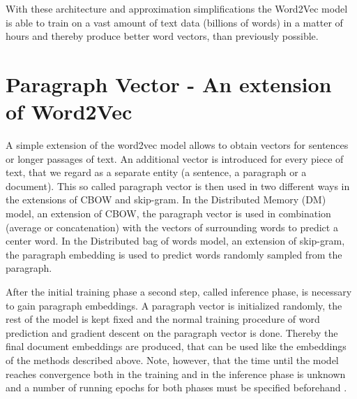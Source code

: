 \documentclass[Thesis.tex]{subfiles}
\begin{document}
With these architecture and approximation simplifications the Word2Vec
model is able to train on a vast amount of text data (billions of
words) in a matter of hours and thereby produce better word vectors,
than previously possible.


\section{Paragraph Vector - An extension of Word2Vec}

A simple extension of the word2vec model allows to obtain vectors
for sentences or longer passages of text. An additional vector is
introduced for every piece of text, that we regard as a separate entity
(a sentence, a paragraph or a document). This so called paragraph
vector is then used in two different ways in the extensions of CBOW
and skip-gram. In the Distributed Memory (DM) model, an extension
of CBOW, the paragraph vector is used in combination (average or concatenation)
with the vectors of surrounding words to predict a center word. In
the Distributed bag of words model, an extension of skip-gram, the
paragraph embedding is used to predict words randomly sampled from
the paragraph.

After the initial training phase a second step, called inference phase, is necessary to gain paragraph embeddings. A paragraph vector is initialized randomly, the rest of the model is kept fixed and the normal training procedure of word prediction and gradient descent on the paragraph vector is done. Thereby the final document embeddings are produced, that can be used like the embeddings of the methods described above. Note, however, that the time until the model reaches convergence both in the training and in the inference phase is unknown and a number of running epochs for both phases must be specified beforehand \citep{Le2014}.
\end{document}
